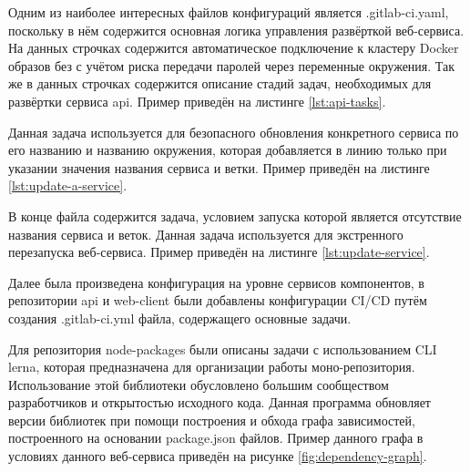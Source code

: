 Одним из наиболее интересных файлов конфигураций является .gitlab-ci.yaml, поскольку в нём содержится основная логика управления развёрткой веб-сервиса.
На данных строчках содержится автоматическое подключение к кластеру Docker образов без с учётом риска передачи паролей через переменные окружения.
Так же в данных строчках содержится описание стадий задач, необходимых для развёртки сервиса api.
Пример приведён на листинге \ref{lst:api-tasks}.



Данная задача используется для безопасного обновления конкретного сервиса по его названию и названию окружения, которая добавляется в линию только при указании значения названия сервиса и ветки.
Пример приведён на листинге \ref{lst:update-a-service}.



В конце файла содержится задача, условием запуска которой является отсутствие названия сервиса и веток.
Данная задача используется для экстренного перезапуска веб-сервиса.
Пример приведён на листинге \ref{lst:update-service}.



Далее была произведена конфигурация на уровне сервисов компонентов, в репозитории api и web-client были добавлены конфигурации CI/CD путём создания .gitlab-ci.yml файла, содержащего основные задачи.

Для репозитория node-packages были описаны задачи с использованием CLI lerna, которая предназначена для организации работы моно-репозитория.
Использование этой библиотеки обусловлено большим сообществом разработчиков и открытостью исходного кода.
Данная программа обновляет версии библиотек при помощи построения и обхода графа зависимостей, построенного на основании package.json файлов.
Пример данного графа в условиях данного веб-сервиса приведён на рисунке \ref{fig:dependency-graph}.


